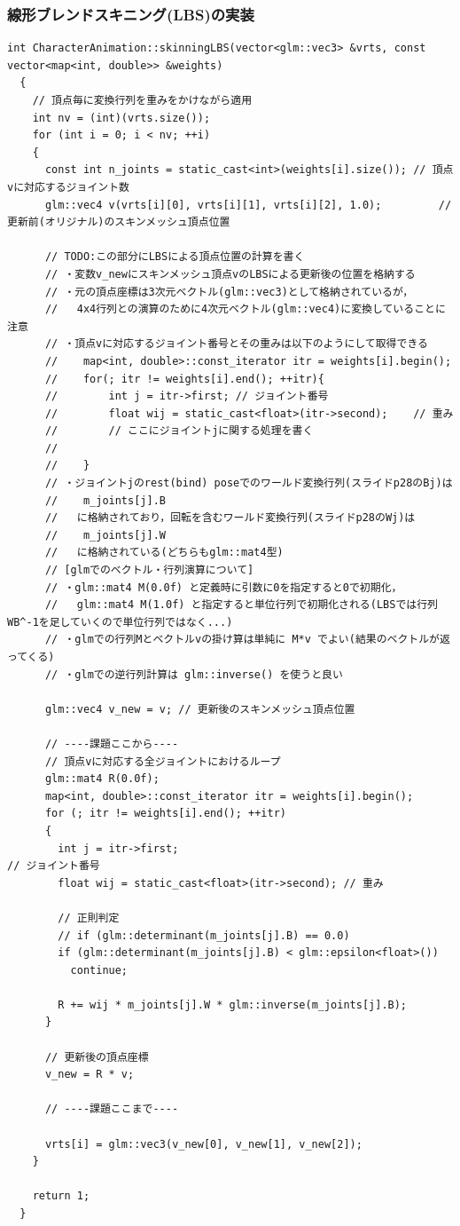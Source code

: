 \documentclass[a4paper,10pt,uplatex,dvipdfmx]{jsarticle}
\begin{document}
\subsubsection{線形ブレンドスキニング(LBS)の実装}
\begin{lstlisting}[caption=characteranimation.cppのskinningLBS関数]
  int CharacterAnimation::skinningLBS(vector<glm::vec3> &vrts, const vector<map<int, double>> &weights)
  {
    // 頂点毎に変換行列を重みをかけながら適用
    int nv = (int)(vrts.size());
    for (int i = 0; i < nv; ++i)
    {
      const int n_joints = static_cast<int>(weights[i].size()); // 頂点vに対応するジョイント数
      glm::vec4 v(vrts[i][0], vrts[i][1], vrts[i][2], 1.0);			// 更新前(オリジナル)のスキンメッシュ頂点位置
  
      // TODO:この部分にLBSによる頂点位置の計算を書く
      // ・変数v_newにスキンメッシュ頂点vのLBSによる更新後の位置を格納する
      // ・元の頂点座標は3次元ベクトル(glm::vec3)として格納されているが，
      //   4x4行列との演算のために4次元ベクトル(glm::vec4)に変換していることに注意
      // ・頂点vに対応するジョイント番号とその重みは以下のようにして取得できる
      //	map<int, double>::const_iterator itr = weights[i].begin();
      //	for(; itr != weights[i].end(); ++itr){
      //		int j = itr->first;	// ジョイント番号
      //		float wij = static_cast<float>(itr->second);	// 重み
      //		// ここにジョイントjに関する処理を書く
      //
      //	}
      // ・ジョイントjのrest(bind) poseでのワールド変換行列(スライドp28のBj)は
      //    m_joints[j].B
      //   に格納されており，回転を含むワールド変換行列(スライドp28のWj)は
      //    m_joints[j].W
      //   に格納されている(どちらもglm::mat4型)
      // [glmでのベクトル・行列演算について]
      // ・glm::mat4 M(0.0f) と定義時に引数に0を指定すると0で初期化，
      //   glm::mat4 M(1.0f) と指定すると単位行列で初期化される(LBSでは行列WB^-1を足していくので単位行列ではなく...)
      // ・glmでの行列Mとベクトルvの掛け算は単純に M*v でよい(結果のベクトルが返ってくる)
      // ・glmでの逆行列計算は glm::inverse() を使うと良い
  
      glm::vec4 v_new = v; // 更新後のスキンメッシュ頂点位置
  
      // ----課題ここから----
      // 頂点vに対応する全ジョイントにおけるループ
      glm::mat4 R(0.0f);
      map<int, double>::const_iterator itr = weights[i].begin();
      for (; itr != weights[i].end(); ++itr)
      {
        int j = itr->first;													 // ジョイント番号
        float wij = static_cast<float>(itr->second); // 重み
  
        // 正則判定
        // if (glm::determinant(m_joints[j].B) == 0.0)
        if (glm::determinant(m_joints[j].B) < glm::epsilon<float>())
          continue;
  
        R += wij * m_joints[j].W * glm::inverse(m_joints[j].B);
      }
  
      // 更新後の頂点座標
      v_new = R * v;
  
      // ----課題ここまで----
  
      vrts[i] = glm::vec3(v_new[0], v_new[1], v_new[2]);
    }
  
    return 1;
  }
\end{lstlisting}
\end{document}
